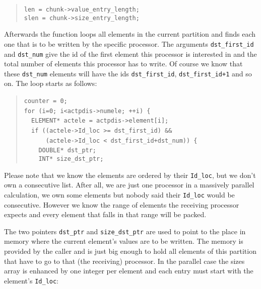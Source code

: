 \begin{quote}
\texttt{len~=~chunk->value{\_}entry{\_}length;~}~\\
 \texttt{slen~=~chunk->size{\_}entry{\_}length; }
\end{quote}
Afterwards the function loops all elements in the current partition
and finds each one that is to be written by the specific processor.
The arguments \texttt{dst{\_}first{\_}id} and \texttt{dst{\_}num}
give the id of the first element this processor is interested in and
the total number of elements this processor has to write. Of course
we know that these \texttt{dst{\_}num} elements will have the ids
\texttt{dst{\_}first{\_}id}, \texttt{dst{\_}first{\_}id+1}
and so on. The loop starts as follows: 

\begin{quote}
\texttt{counter~=~0;~}~\\
 \texttt{for~(i=0;~i<actpdis->numele;~++i)~{\{}~}~\\
 \texttt{~~ELEMENT{*}~actele~=~actpdis->element{[}i];~}~\\
 \texttt{~~if~((actele->Id{\_}loc~>=~dst{\_}first{\_}id)~{\&}{\&}~}~\\
 \texttt{~~~~~~(actele->Id{\_}loc~<~dst{\_}first{\_}id+dst{\_}num))~{\{}~}~\\
 \texttt{~~~~DOUBLE{*}~dst{\_}ptr;~}~\\
 \texttt{~~~~INT{*}~size{\_}dst{\_}ptr; }
\end{quote}
Please note that we know the elements are ordered by their \texttt{Id{\_}loc},
but we don't own a consecutive list. After all, we are just one processor
in a massively parallel calculation, we own some elements but nobody
said their \texttt{Id{\_}loc} would be consecutive. However we know
the range of elements the receiving processor expects and every element
that falls in that range will be packed.

The two pointers \texttt{dst{\_}ptr} and \texttt{size{\_}dst{\_}ptr}
are used to point to the place in memory where the current element's
values are to be written. The memory is provided by the caller and
is just big enough to hold all elements of this partition that have
to go to that (the receiving) processor. In the parallel case the
sizes array is enhanced by one integer per element and each entry
must start with the element's \texttt{Id{\_}loc}: 

